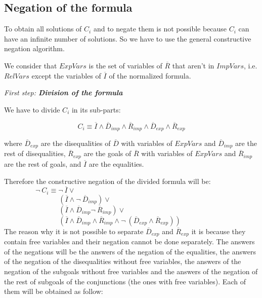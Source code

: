 \documentclass{llncs}
\begin{document}
 


\subsection{Negation of the formula}
\label{negation}

To obtain all solutions of $C_i$ and to negate them is not possible
because $C_i$ can have an infinite number of solutions. So we have to
use the general constructive negation algorithm.  

We consider that $ExpVars$ is the set of variables of $\overline{R}$
that aren't in $ImpVars$, i.e. $RelVars$ except the variables of
$\overline{I}$ of the normalized formula.

\noindent
{\em First step: {\bf Division of the formula}}

\noindent
We have to divide $C_i$ in its sub-parts:

\[C_i \equiv \overline{I} \wedge
        \overline{D}_{imp} \wedge \overline{R}_{imp} \wedge
        \overline{D}_{exp} \wedge \overline{R}_{exp} \]

\noindent
where $\overline{D}_{exp}$ are the disequalities of $\overline{D}$
with variables of $ExpVars$ and $\overline{D}_{imp}$ are the rest of
disequalities, $\overline{R}_{exp}$ are the goals of $\overline{R}$
with variables of $ExpVars$ and $\overline{R}_{imp}$ are the rest of
goals, and $\overline{I}$ are the equalities.

Therefore the constructive negation of the divided formula will be: \\

$~~~~~~~~~~~~~~~~~~~~\neg~C_i \equiv \neg~\overline{I} \vee $ \\
$~~~~~~~~~~~~~~~~~~~~~~~~~~~~~~~~~~~(\overline{I} \wedge \neg~\overline{D}_{imp}) \vee  $ \\
$~~~~~~~~~~~~~~~~~~~~~~~~~~~~~~~~~~~(\overline{I} \wedge \overline{D}_{imp} \neg~\overline{R}_{imp}) \vee $ \\
$~~~~~~~~~~~~~~~~~~~~~~~~~~~~~~~~~~~( \overline{I} \wedge \overline{D}_{imp} \wedge \overline{R}_{imp} \wedge \neg~(\overline{D}_{exp} \wedge \overline{R}_{exp})) $ \\

The reason why it is not possible to separate $\overline{D}_{exp}$ and
$\overline{R}_{exp}$ it is because they contain free variables and
their negation cannot be done separately. The answers of the negations
will be the answers of the negation of the equalities, the answers of
the negation of the disequalities without free variables, the answers
of the negation of the subgoals without free variables and the answers
of the negation of the rest of subgoals of the conjunctions (the ones
with free variables). Each of them will be obtained as follow:
\end{document}

